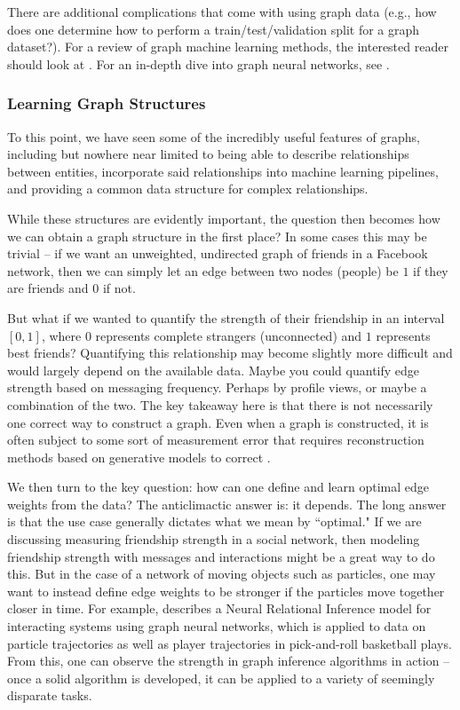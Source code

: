 \documentclass[12pt]{article}
\theoremstyle{definition}
\begin{document}
There are additional complications that come with using graph data (e.g., how does one determine how to perform a train/test/validation split for a graph dataset?). For a review of graph machine learning methods, the interested reader should look at \cite{graphMLSurvey}. For an in-depth dive into graph neural networks, see \cite{GNNsurvey}.

\subsubsection{Learning Graph Structures}
\label{subsubsec:learningGraphStructures}

To this point, we have seen some of the incredibly useful features of graphs, including but nowhere near limited to being able to describe relationships between entities, incorporate said relationships into machine learning pipelines, and providing a common data structure for complex relationships.

While these structures are evidently important, the question then becomes how we can obtain a graph structure in the first place? In some cases this may be trivial -- if we want an unweighted, undirected graph of friends in a Facebook network, then we can simply let an edge between two nodes (people) be $1$ if they are friends and $0$ if not.

But what if we wanted to quantify the strength of their friendship in an interval $[0,1]$, where $0$ represents complete strangers (unconnected) and $1$ represents best friends? Quantifying this relationship may become slightly more difficult and would largely depend on the available data. Maybe you could quantify edge strength based on messaging frequency. Perhaps by profile views, or maybe a combination of the two. The key takeaway here is that there is not necessarily one correct way to construct a graph. Even when a graph is constructed, it is often subject to some sort of measurement error that requires reconstruction methods based on generative models to correct \cite{PhysRevReconstructingNetworksErrors}.

We then turn to the key question: how can one define and learn optimal edge weights from the data? The anticlimactic answer is: it depends. The long answer is that the use case generally dictates what we mean by ``optimal." If we are discussing measuring friendship strength in a social network, then modeling friendship strength with messages and interactions might be a great way to do this. But in the case of a network of moving objects such as particles, one may want to instead define edge weights to be stronger if the particles move together closer in time. For example, \cite{kipf2018NRI} describes a Neural Relational Inference model for interacting systems using graph neural networks, which is applied to data on particle trajectories as well as player trajectories in pick-and-roll basketball plays. From this, one can observe the strength in graph inference algorithms in action -- once a solid algorithm is developed, it can be applied to a variety of seemingly disparate tasks.
\end{document}
